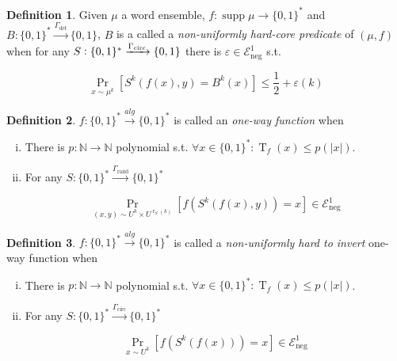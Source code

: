 \documentclass{article}
\numberwithin{equation}{section}
\theoremstyle{definition}
\newtheorem{definition}{Definition}[section]
\theoremstyle{plain}
\newcommand{\Words}{{\{ 0, 1 \}^*}}
\newcommand{\Bool}{\{0,1\}}
\DeclareMathOperator{\Supp}{supp}
\DeclareMathOperator{\Prb}{Pr}
\DeclareMathOperator{\T}{T}
\DeclareMathOperator{\R}{r}
\newcommand{\Nats}{\mathbb{N}}
\newcommand{\Abs}[1]{\lvert #1 \rvert}
\begin{document}
\begin{samepage}
\begin{definition}

Given $\mu$ a word ensemble, $f: \Supp \mu \rightarrow \Words$ and ${B: \Words \xrightarrow{\Gamma_{\text{det}}} \Bool}$, $B$ is a called a \emph{non-uniformly hard-core predicate} of $(\mu,f)$ when for any ${S: \Words \xrightarrow{\Gamma_{\textnormal{circ}}} \Bool}$ there is $\varepsilon \in \mathcal{E}_{\text{neg}}^1$ s.t. 

\begin{equation}
\Prb_{x \sim \mu^k}[S^k(f(x),y)=B^k(x)] \leq \frac{1}{2} + \varepsilon(k)
\end{equation}

\end{definition}
\end{samepage}

\begin{samepage}
\begin{definition}

$f: \Words \xrightarrow{alg} \Words$ is called an \emph{one-way function}
when

\begin{enumerate}[(i)]

\item There is $p: \Nats \rightarrow \Nats$ polynomial s.t. $\forall x \in \Words: \T_f(x) \leq p(\Abs{x})$.

\item For any $S: \Words \xrightarrow{\Gamma_{\text{rand}}} \Words$

\begin{equation}
\Prb_{(x,y) \sim U^k \times U^{\R_S(k)}}[f(S^k(f(x),y))=x] \in \mathcal{E}_{\text{neg}}^1
\end{equation}

\end{enumerate}

\end{definition}
\end{samepage}

\begin{samepage}
\begin{definition}

$f: \Words \xrightarrow{alg} \Words$ is called a \emph{non-uniformly hard to invert} one-way function
when

\begin{enumerate}[(i)]

\item There is $p: \Nats \rightarrow \Nats$ polynomial s.t. $\forall x \in \Words: \T_f(x) \leq p(\Abs{x})$.

\item For any $S: \Words \xrightarrow{\Gamma_{\text{circ}}} \Words$

\begin{equation}
\Prb_{x \sim U^k}[f(S^k(f(x)))=x] \in \mathcal{E}_{\text{neg}}^1
\end{equation}

\end{enumerate}

\end{definition}
\end{samepage}
\end{document}
